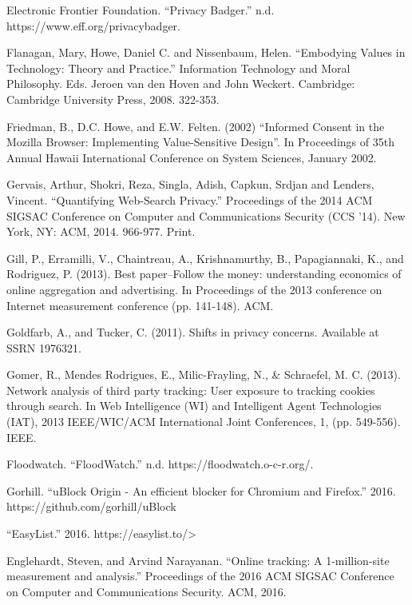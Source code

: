 \documentclass[conference]{IEEEtran}
\begin{document}
\begin{thebibliography}{99}
 Electronic Frontier Foundation. ``Privacy Badger.'' n.d. https://www.eff.org/privacybadger.

 Flanagan, Mary, Howe, Daniel C. and Nissenbaum, Helen. ``Embodying Values in Technology: Theory and Practice.'' Information Technology and Moral Philosophy. Eds. Jeroen van den Hoven and John Weckert. Cambridge: Cambridge University Press, 2008. 322-353.

 Friedman, B., D.C. Howe, and E.W. Felten. (2002) ``Informed Consent in the Mozilla Browser: Implementing Value-Sensitive Design''. In Proceedings of 35th Annual Hawaii International Conference on System Sciences, January 2002.

 Gervais, Arthur, Shokri, Reza, Singla, Adish, Capkun, Srdjan and Lenders, Vincent. ``Quantifying Web-Search Privacy.'' Proceedings of the 2014 ACM SIGSAC Conference on Computer and Communications Security (CCS '14). New York, NY: ACM, 2014. 966-977. Print.

 Gill, P., Erramilli, V., Chaintreau, A., Krishnamurthy, B., Papagiannaki, K., and Rodriguez, P. (2013). Best paper--Follow the money: understanding economics of online aggregation and advertising. In Proceedings of the 2013 conference on Internet measurement conference (pp. 141-148). ACM.

 Goldfarb, A., and Tucker, C. (2011). Shifts in privacy concerns. Available at SSRN 1976321.

 Gomer, R., Mendes Rodrigues, E., Milic-Frayling, N., \& Schraefel, M. C. (2013). Network analysis of third party tracking: User exposure to tracking cookies through search. In Web Intelligence (WI) and Intelligent Agent Technologies (IAT), 2013 IEEE/WIC/ACM International Joint Conferences, 1, (pp. 549-556). IEEE.

 Floodwatch. ``FloodWatch.'' n.d. https://floodwatch.o-c-r.org/.

 Gorhill. ``uBlock Origin - An efficient blocker for Chromium and Firefox.'' 2016. https://github.com/gorhill/uBlock

 ``EasyList.'' 2016. https://easylist.to/>

 Englehardt, Steven, and Arvind Narayanan. ``Online tracking: A 1-million-site measurement and analysis.'' Proceedings of the 2016 ACM SIGSAC Conference on Computer and Communications Security. ACM, 2016.


\end{thebibliography}
\end{document}
